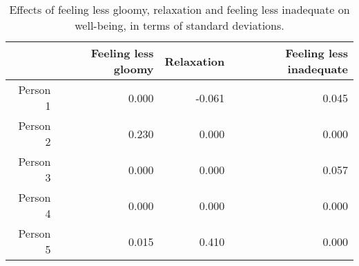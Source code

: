 \begin{table}[ht]
\centering
\begin{tabular}{rrrr}
  \toprule
 & Feeling less gloomy & Relaxation & Feeling less inadequate \\ 
  \midrule
Person 1 & 0.000 & -0.061 & 0.045 \\ 
  Person 2 & 0.230 & 0.000 & 0.000 \\ 
  Person 3 & 0.000 & 0.000 & 0.057 \\ 
  Person 4 & 0.000 & 0.000 & 0.000 \\ 
  Person 5 & 0.015 & 0.410 & 0.000 \\ 
   \bottomrule
\end{tabular}
\caption{Effects of feeling less gloomy, relaxation and feeling less inadequate on well-being, in terms of standard deviations.} 
\label{tab:effects_in_aira}
\end{table}
